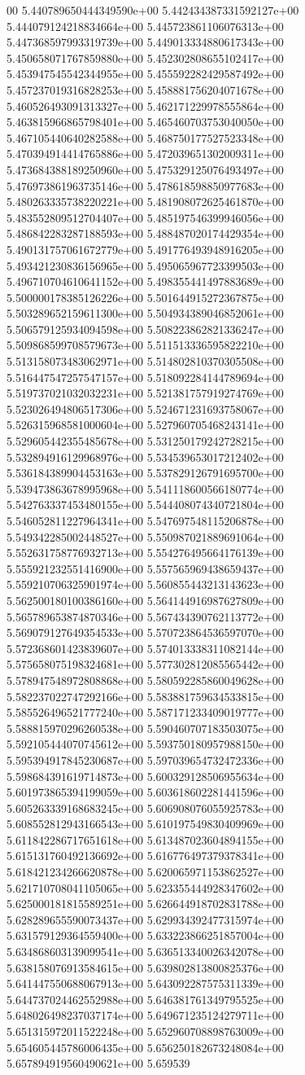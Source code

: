 00	5.440789650444349590e+00	5.442434387331592127e+00	5.444079124218834664e+00	5.445723861106076313e+00	5.447368597993319739e+00	5.449013334880617343e+00	5.450658071767859880e+00	5.452302808655102417e+00	5.453947545542344955e+00	5.455592282429587492e+00	5.457237019316828253e+00	5.458881756204071678e+00	5.460526493091313327e+00	5.462171229978555864e+00	5.463815966865798401e+00	5.465460703753040050e+00	5.467105440640282588e+00	5.468750177527523348e+00	5.470394914414765886e+00	5.472039651302009311e+00	5.473684388189250960e+00	5.475329125076493497e+00	5.476973861963735146e+00	5.478618598850977683e+00	5.480263335738220221e+00	5.481908072625461870e+00	5.483552809512704407e+00	5.485197546399946056e+00	5.486842283287188593e+00	5.488487020174429354e+00	5.490131757061672779e+00	5.491776493948916205e+00	5.493421230836156965e+00	5.495065967723399503e+00	5.496710704610641152e+00	5.498355441497883689e+00	5.500000178385126226e+00	5.501644915272367875e+00	5.503289652159611300e+00	5.504934389046852061e+00	5.506579125934094598e+00	5.508223862821336247e+00	5.509868599708579673e+00	5.511513336595822210e+00	5.513158073483062971e+00	5.514802810370305508e+00	5.516447547257547157e+00	5.518092284144789694e+00	5.519737021032032231e+00	5.521381757919274769e+00	5.523026494806517306e+00	5.524671231693758067e+00	5.526315968581000604e+00	5.527960705468243141e+00	5.529605442355485678e+00	5.531250179242728215e+00	5.532894916129968976e+00	5.534539653017212402e+00	5.536184389904453163e+00	5.537829126791695700e+00	5.539473863678995968e+00	5.541118600566180774e+00	5.542763337453480155e+00	5.544408074340721804e+00	5.546052811227964341e+00	5.547697548115206878e+00	5.549342285002448527e+00	5.550987021889691064e+00	5.552631758776932713e+00	5.554276495664176139e+00	5.555921232551416900e+00	5.557565969438659437e+00	5.559210706325901974e+00	5.560855443213143623e+00	5.562500180100386160e+00	5.564144916987627809e+00	5.565789653874870346e+00	5.567434390762113772e+00	5.569079127649354533e+00	5.570723864536597070e+00	5.572368601423839607e+00	5.574013338311082144e+00	5.575658075198324681e+00	5.577302812085565442e+00	5.578947548972808868e+00	5.580592285860049628e+00	5.582237022747292166e+00	5.583881759634533815e+00	5.585526496521777240e+00	5.587171233409019777e+00	5.588815970296260538e+00	5.590460707183503075e+00	5.592105444070745612e+00	5.593750180957988150e+00	5.595394917845230687e+00	5.597039654732472336e+00	5.598684391619714873e+00	5.600329128506955634e+00	5.601973865394199059e+00	5.603618602281441596e+00	5.605263339168683245e+00	5.606908076055925783e+00	5.608552812943166543e+00	5.610197549830409969e+00	5.611842286717651618e+00	5.613487023604894155e+00	5.615131760492136692e+00	5.616776497379378341e+00	5.618421234266620878e+00	5.620065971153862527e+00	5.621710708041105065e+00	5.623355444928347602e+00	5.625000181815589251e+00	5.626644918702831788e+00	5.628289655590073437e+00	5.629934392477315974e+00	5.631579129364559400e+00	5.633223866251857004e+00	5.634868603139099541e+00	5.636513340026342078e+00	5.638158076913584615e+00	5.639802813800825376e+00	5.641447550688067913e+00	5.643092287575311339e+00	5.644737024462552988e+00	5.646381761349795525e+00	5.648026498237037174e+00	5.649671235124279711e+00	5.651315972011522248e+00	5.652960708898763009e+00	5.654605445786006435e+00	5.656250182673248084e+00	5.657894919560490621e+00	5.659539